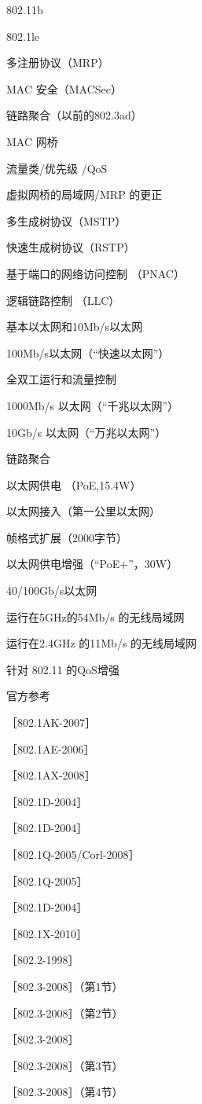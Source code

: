 802.11b

802.1le

多注册协议（MRP）

MAC 安全（MACSec）

链路聚合（以前的802.3ad）

MAC 网桥

流量类/优先级 /QoS

虚拟网桥的局域网/MRP 的更正

多生成树协议（MSTP）

快速生成树协议（RSTP）

基于端口的网络访问控制 （PNAC）

逻辑链路控制 （LLC）

基本以太网和10Mb/s以太网

100Mb/s以太网（“快速以太网”）

全双工运行和流量控制

1000Mb/s 以太网（“千兆以太网”）

10Gb/s 以太网（“万兆以太网”）

链路聚合

以太网供电 （PoE,15.4W）

以太网接入（第一公里以太网）

帧格式扩展（2000字节）

以太网供电增强（“PoE+”，30W）

40/100Gb/s以太网

运行在5GHz的54Mb/s 的无线局域网

运行在2.4GHz 的11Mb/s 的无线局域网

针对 802.11 的QoS增强

官方参考

［802.1AK-2007］

［802.1AE-2006］

［802.1AX-2008］

［802.1D-2004］

［802.1D-2004］

［802.1Q-2005/Corl-2008］

［802.1Q-2005］

［802.1D-2004］

［802.1X-2010］

［802.2-1998］

［802.3-2008］（第1节）

［802.3-2008］（第2节）

［802.3-2008］

［802.3-2008］（第3节）

［802.3-2008］（第4节）

